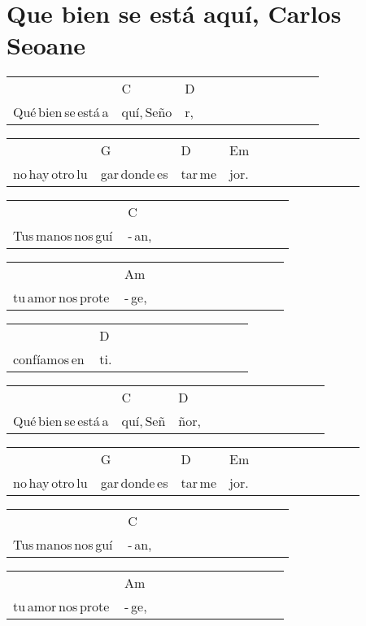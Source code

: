 \section*{Que bien se está aquí, Carlos Seoane\hfill}
\begin{multicols}{2}
\noindent
\begin{minipage}{\columnwidth}
\noindent
\noindent
\begin{tabular}{llllllllllll}
&C&D\\
Qué\,bien\,se\,está\,a&quí,\,Seño&r,
\end{tabular}

\noindent
\begin{tabular}{llllllllllll}
&G&D&Em\\
no\,hay\,otro\,lu&gar\,donde\,es&tar\,me&jor.
\end{tabular}

\noindent
\begin{tabular}{llllllllllll}
&C\\
Tus\,manos\,nos\,guí\,&-\,an,
\end{tabular}

\noindent
\begin{tabular}{llllllllllll}
&Am\\
tu\,amor\,nos\,prote\,&-\,ge,
\end{tabular}

\noindent
\begin{tabular}{llllllllllll}
&D\\
confíamos\,en\,&ti.
\end{tabular}

\noindent
\begin{tabular}{llllllllllll}
&C&D\\
Qué\,bien\,se\,está\,a&quí,\,Señ&ñor,
\end{tabular}

\noindent
\begin{tabular}{llllllllllll}
&G&D&Em\\
no\,hay\,otro\,lu&gar\,donde\,es&tar\,me&jor.
\end{tabular}

\noindent
\begin{tabular}{llllllllllll}
&C\\
Tus\,manos\,nos\,guí\,&-\,an,
\end{tabular}

\noindent
\begin{tabular}{llllllllllll}
&Am\\
tu\,amor\,nos\,prote\,&-\,ge,
\end{tabular}


\end{minipage}
\end{multicols}
